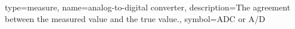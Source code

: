 \renewcommand{\thisgls}{temp}
{type=measure,
name=analog-to-digital converter,
description={The agreement between the measured value and the true value.},
symbol={ADC or A/D}
}
